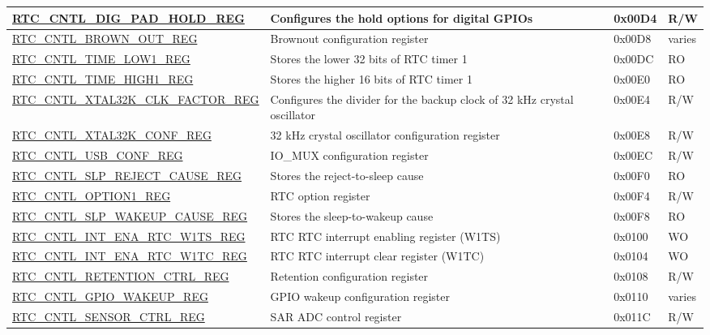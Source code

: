 \begin{longtable}{ | l | p{7cm} | p{1.3cm} | p{1cm} | }
\hyperref[regdesc:RTCCNTLDIGPADHOLDREG]{RTC\_CNTL\_DIG\_PAD\_HOLD\_REG} & Configures the hold options for digital GPIOs & 0x00D4 & R/W \\ \hline
\hyperref[regdesc:RTCCNTLBROWNOUTREG]{RTC\_CNTL\_BROWN\_OUT\_REG} & Brownout configuration register & 0x00D8 & varies \\ \hline
\hyperref[regdesc:RTCCNTLTIMELOW1REG]{RTC\_CNTL\_TIME\_LOW1\_REG} & Stores the lower 32 bits of RTC timer 1 & 0x00DC & RO \\ \hline
\hyperref[regdesc:RTCCNTLTIMEHIGH1REG]{RTC\_CNTL\_TIME\_HIGH1\_REG} & Stores the higher 16 bits of RTC timer 1 & 0x00E0 & RO \\ \hline
\hyperref[regdesc:RTCCNTLXTAL32KCLKFACTORREG]{RTC\_CNTL\_XTAL32K\_CLK\_FACTOR\_REG} & Configures the divider for the backup clock of 32 kHz crystal oscillator & 0x00E4 & R/W \\ \hline
\hyperref[regdesc:RTCCNTLXTAL32KCONFREG]{RTC\_CNTL\_XTAL32K\_CONF\_REG} & 32 kHz crystal oscillator configuration register & 0x00E8 & R/W \\ \hline
\hyperref[regdesc:RTCCNTLUSBCONFREG]{RTC\_CNTL\_USB\_CONF\_REG} & IO\_MUX configuration register & 0x00EC & R/W \\ \hline
\hyperref[regdesc:RTCCNTLSLPREJECTCAUSEREG]{RTC\_CNTL\_SLP\_REJECT\_CAUSE\_REG} & Stores the reject-to-sleep cause & 0x00F0 & RO \\ \hline
\hyperref[regdesc:RTCCNTLOPTION1REG]{RTC\_CNTL\_OPTION1\_REG} & RTC option register & 0x00F4 & R/W \\ \hline
\hyperref[regdesc:RTCCNTLSLPWAKEUPCAUSEREG]{RTC\_CNTL\_SLP\_WAKEUP\_CAUSE\_REG} & Stores the sleep-to-wakeup cause & 0x00F8 & RO \\ \hline
\hyperref[regdesc:RTCCNTLINTENARTCW1TSREG]{RTC\_CNTL\_INT\_ENA\_RTC\_W1TS\_REG} & RTC RTC interrupt enabling register (W1TS) & 0x0100 & WO \\ \hline
\hyperref[regdesc:RTCCNTLINTENARTCW1TCREG]{RTC\_CNTL\_INT\_ENA\_RTC\_W1TC\_REG} & RTC RTC interrupt clear register (W1TC) & 0x0104 & WO \\ \hline
\hyperref[regdesc:RTCCNTLRETENTIONCTRLREG]{RTC\_CNTL\_RETENTION\_CTRL\_REG} & Retention configuration register & 0x0108 & R/W \\ \hline
\hyperref[regdesc:RTCCNTLGPIOWAKEUPREG]{RTC\_CNTL\_GPIO\_WAKEUP\_REG} & GPIO wakeup configuration register & 0x0110 & varies \\ \hline
\hyperref[regdesc:RTCCNTLSENSORCTRLREG]{RTC\_CNTL\_SENSOR\_CTRL\_REG} & SAR ADC control register & 0x011C & R/W \\ \hline
\end{longtable}
